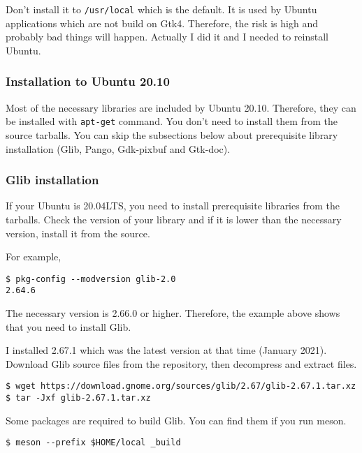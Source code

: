 Don't install it to \passthrough{\lstinline!/usr/local!} which is the
default. It is used by Ubuntu applications which are not build on Gtk4.
Therefore, the risk is high and probably bad things will happen.
Actually I did it and I needed to reinstall Ubuntu.

\hypertarget{installation-to-ubuntu-20.10}{%
\subsubsection{Installation to Ubuntu
20.10}\label{installation-to-ubuntu-20.10}}

Most of the necessary libraries are included by Ubuntu 20.10. Therefore,
they can be installed with \passthrough{\lstinline!apt-get!} command.
You don't need to install them from the source tarballs. You can skip
the subsections below about prerequisite library installation (Glib,
Pango, Gdk-pixbuf and Gtk-doc).

\hypertarget{glib-installation}{%
\subsubsection{Glib installation}\label{glib-installation}}

If your Ubuntu is 20.04LTS, you need to install prerequisite libraries
from the tarballs. Check the version of your library and if it is lower
than the necessary version, install it from the source.

For example,

\begin{lstlisting}
$ pkg-config --modversion glib-2.0
2.64.6
\end{lstlisting}

The necessary version is 2.66.0 or higher. Therefore, the example above
shows that you need to install Glib.

I installed 2.67.1 which was the latest version at that time (January
2021). Download Glib source files from the repository, then decompress
and extract files.

\begin{lstlisting}
$ wget https://download.gnome.org/sources/glib/2.67/glib-2.67.1.tar.xz
$ tar -Jxf glib-2.67.1.tar.xz
\end{lstlisting}

Some packages are required to build Glib. You can find them if you run
meson.

\begin{lstlisting}
$ meson --prefix $HOME/local _build
\end{lstlisting}

